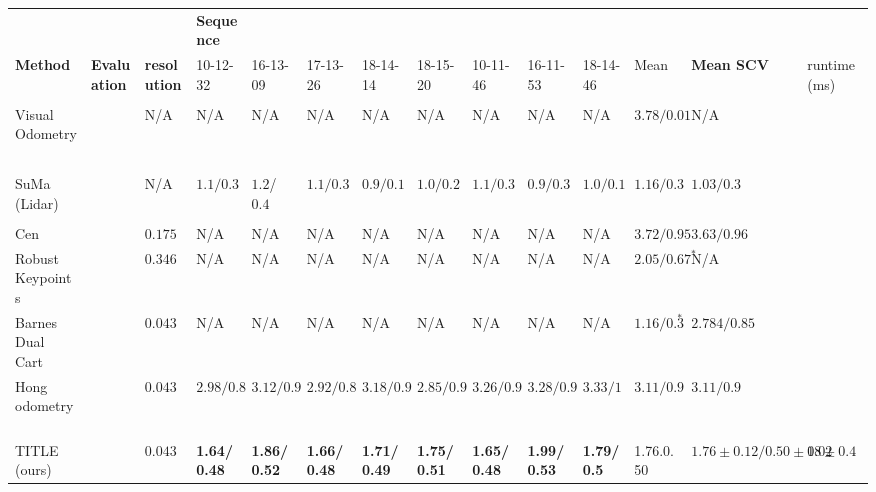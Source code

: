 \begin{table*}
\centering
  \begin{adjustbox}{width=\textwidth}

\begin{tabular}{l|ll|lllllllll|l|l}
              & & & \multicolumn{1}{l}{\textbf{Sequence}}    &                                                                        \\
\textbf{Method} & \textbf{Evaluation} & \textbf{resolution}        & 10-12-32 & 16-13-09 & 17-13-26 & 18-14-14 & 18-15-20 & 10-11-46 & 16-11-53 & 18-14-46 & Mean  & \textbf{Mean SCV} & runtime (ms)   \\
\hline \\
Visual Odometry  ~\cite{Churchill2012ExperienceBN} & ~\cite{barnes_masking_2020} & N/A   & N/A        & N/A        & N/A        & N/A        & N/A        & N/A        & N/A        & N/A        &    $3.78/0.01$ & N/A   &      \\
\hline \\
SuMa (Lidar)~\cite{behley2018rss}  & ~\cite{hong2020radarslam }& N/A  & $1.1/0.3$ & $1.2$/$0.4$ & $1.1/0.3$ & $0.9/0.1$ & $1.0/0.2$  & $1.1/0.3$        & $0.9/0.3$        & $1.0/0.1$        & $1.16/0.3$    & $1.03/0.3$  &       \\
\hline \\
Cen~\cite{8460687}    &   ~\cite{barnes_masking_2020} & $0.175$& N/A        & N/A        & N/A        & N/A        & N/A        & N/A        & N/A        & N/A        & $3.72/0.95$    & $3.63/0.96$ &        \\
Robust Keypoints~\cite{barnes_under_2020}    &  & $0.346$    & N/A        & N/A        & N/A        & N/A        & N/A        & N/A        & N/A        & N/A        & $2.05/0.67^*$    & N/A  &         \\
Barnes Dual Cart~\cite{barnes_masking_2020} & & $0.043$ & N/A        & N/A        & N/A        & N/A        & N/A        & N/A        & N/A        & N/A        & $\bm{1.16/0.3}^*$    &   $2.784/0.85 $ &\\
Hong odometry~\cite{hong2020radarslam} & &$0.043$ & $2.98/0.8$        & $3.12/0.9$        & $2.92/0.8$        & $3.18/0.9$        & $2.85/0.9$        & $3.26/0.9$        & $3.28/0.9$        & $3.33/1$        & $3.11/0.9$    & $3.11/0.9$ &        \\
\ac{TITLE} (ours) &  & $0.043$ & \textbf{1.64/0.48}          & \textbf{1.86/0.52}        & \textbf{1.66/0.48}        & \textbf{1.71/0.49}        & \textbf{1.75/0.51}        & \textbf{1.65/0.48}        & \textbf{1.99/0.53}        & \textbf{1.79/0.5}        & 
1.76.0.50    & 
$\bm{1.76\pm0.12/0.50\pm0.02}$  & $18\pm 0.4$ 
\end{tabular}
  \end{adjustbox}


\end{table*}
